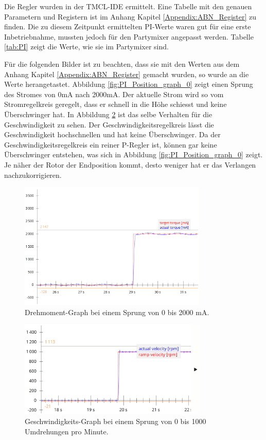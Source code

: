 Die Regler wurden in der TMCL-IDE ermittelt. Eine Tabelle mit den genauen Parametern und Registern ist im Anhang Kapitel \ref{Appendix:ABN_Register} zu finden. Die zu diesem Zeitpunkt ermittelten PI-Werte waren gut für eine erste Inbetriebnahme, mussten jedoch für den Partymixer angepasst werden. Tabelle \ref{tab:PI} zeigt die Werte, wie sie im Partymixer sind.

Für die folgenden Bilder ist zu beachten, dass sie mit den Werten aus dem Anhang Kapitel \ref{Appendix:ABN_Register} gemacht wurden, so wurde an die Werte herangetastet. Abbildung \ref{fig:PI_Position_graph_0} zeigt einen Sprung des Stromes von 0mA nach 2000mA. Der aktuelle Strom wird so vom Stromregelkreis geregelt, dass er schnell in die Höhe schiesst und keine Überschwinger hat. In Abbildung \ref{fig:PI_Velocity_Graph_0} ist das selbe Verhalten für die Geschwindigkeit zu sehen. Der Geschwindigkeitsregelkreis lässt die Geschwindigkeit hochschnellen und hat keine Überschwinger. Da der Geschwindigkeitsregelkreis ein reiner P-Regler ist, können gar keine Überschwinger entstehen, was sich in Abbildung \ref{fig:PI_Position_graph_0} zeigt. Je näher der Rotor der Endposition kommt, desto weniger hat er das Verlangen nachzukorrigieren.

\begin{figure}[H]
\center
\includegraphics[width = 0.8\textwidth]{graphics/PI_Torque_Graph_0}
\caption{Drehmoment-Graph bei einem Sprung von 0 bis 2000 mA.}
\label{fig:PI_Torque_Graph_0}
\end{figure}


\begin{figure}[H]
\center
\includegraphics[width = 0.8\textwidth]{graphics/PI_Velocity_Graph_0}
\caption{Geschwindigkeits-Graph bei einem Sprung von 0 bis 1000 Umdrehungen pro Minute.}
\label{fig:PI_Velocity_Graph_0}
\end{figure}

